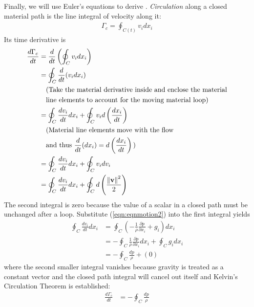 Finally, we will use Euler's equations to derive . \textit{Circulation} along a closed material path is the line integral of velocity along it:
\begin{align}
\Gamma_c = \oint_{C(t)} v_i dx_i
\end{align}
Its time derivative is 
\begin{align}
\frac{d\Gamma_c}{dt} &= \frac{d}{dt}\left(\oint_{C} v_i dx_i\right) \nonumber \\
&= \oint_{C} \frac{d}{dt}(v_i dx_i)  \nonumber \\\
&\quad \begin{aligned}
&\text{(Take the material derivative inside and enclose the material} \\  
&\text{line elements to account for the moving material loop)} 
\end{aligned} \nonumber \\
&= \oint_{C} \frac{dv_i}{dt} dx_i + \oint_{C} v_i d\left(\frac{dx_i}{dt}\right)  \nonumber \\
&\quad \begin{aligned}
&\text{(Material line elements move with the flow} \\ 
&\text{and thus } \frac{d}{dt}(dx_i) = d\left(\frac{dx_i}{dt}\right)\text{)}\end{aligned} \nonumber \\
&= \oint_{C} \frac{dv_i}{dt} dx_i + \oint_{C} v_i dv_i \nonumber \\
&= \oint_{C} \frac{dv_i}{dt} dx_i + \oint_{C} d\left(\frac{\norm{\textbf{v}}^2}{2}\right) 
\end{align}
The second integral is zero because the value of a scalar in a closed path must be unchanged after a loop. Substitute (\ref{eqn:eqnmotion2}) into the first integral yields
\begin{align*}
\oint_{C} \frac{dv_i}{dt} dx_i &= \oint_{C} \left(-\frac{1}{\rho}\frac{\partial p}{\partial x_i} + g_i\right) dx_i \\
&= - \oint_{C} \frac{1}{\rho}\frac{\partial p}{\partial x_i} dx_i + \oint_{C} g_i dx_i \\
&= - \oint_C \frac{dp}{\rho} + (0)
\end{align*}
where the second smaller integral vanishes because gravity is treated as a constant vector and the closed path integral will cancel out itself and Kelvin's Circulation Theorem is established:
\begin{align}
\frac{d\Gamma_c}{dt} &= - \oint_C \frac{dp}{\rho}  
\end{align}

